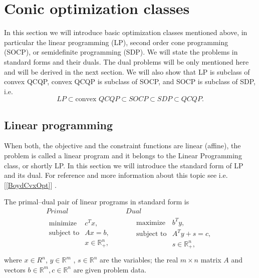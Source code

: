 \documentclass[12pt]{book}
\theoremstyle{definition}
\begin{document}
\chapter{Conic optimization classes}
\label{ConicOptClasses}

In this section we will introduce basic optimization classes mentioned above, in particular the  linear programming (LP), second order cone programming  (SOCP), or semidefinite programming (SDP). We will state the problems in standard forms and their duals. The dual problems will be only mentioned here and will be derived in the next section. We will also show that LP is subclass of convex QCQP, convex QCQP is subclass of SOCP, and SOCP is subclass of SDP, i.e.
\begin{equation}
LP\subset \mbox{convex } QCQP \subset SOCP \subset SDP \subset QCQP .
\end{equation}












\section{Linear programming}

When both, the objective and the constraint functions are linear (affine), the problem is called a linear program and it belongs to the Linear Programming class, or shortly LP.
In this section we will introduce the standard form of LP and its dual. For reference and more information about this topic see i.e. [\ref{BoydCvxOpt}] .

\label{defLP}
The primal--dual pair of linear programs in standard form is 
\begin{equation}
\label{LP} 
\begin{array}{cc}
Primal & Dual \\
\begin{array}{ll}
\mbox{minimize} & c^Tx, \\
\mbox{subject to}& Ax = b ,  \\
& x \in \mathbb{R}^n_+,\\

\end{array} 
\ \ \ \ \ & \ \ \ \ \ 
\begin{array}{ll}
\mbox{maximize} & b^Ty, \\
\mbox{subject to}& A^Ty +s = c ,  \\
& s\in \mathbb{R}^n_+, \\
\end{array}
\end{array} 
\end{equation}
where $x\in R^n$, $y\in \mathbb{R}^m$ , $s\in \mathbb{R}^n$ are the variables; the real $m\times n$ matrix $A$ and vectors $b \in \mathbb{R}^m, c\in \mathbb{R}^n$ are given problem data.
\end{document}
